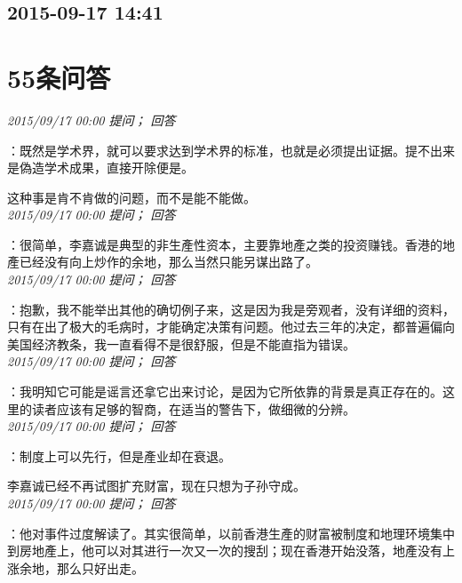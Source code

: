 \documentclass[twocolumn]{ctexart}
\begin{document}
\subsection{2015-09-17 14:41}


\section{55条问答}

\textit{\hfill\noindent\small 2015/09/17 00:00 提问； 回答}

：既然是学术界，就可以要求达到学术界的标准，也就是必须提出证据。提不出来是偽造学术成果，直接开除便是。

这种事是肯不肯做的问题，而不是能不能做。\\

\textit{\hfill\noindent\small 2015/09/17 00:00 提问； 回答}

：很简单，李嘉诚是典型的非生產性资本，主要靠地產之类的投资赚钱。香港的地產已经没有向上炒作的余地，那么当然只能另谋出路了。\\

\textit{\hfill\noindent\small 2015/09/17 00:00 提问； 回答}

：抱歉，我不能举出其他的确切例子来，这是因为我是旁观者，没有详细的资料，只有在出了极大的毛病时，才能确定决策有问题。他过去三年的决定，都普遍偏向美国经济教条，我一直看得不是很舒服，但是不能直指为错误。\\

\textit{\hfill\noindent\small 2015/09/17 00:00 提问； 回答}

：我明知它可能是谣言还拿它出来讨论，是因为它所依靠的背景是真正存在的。这里的读者应该有足够的智商，在适当的警告下，做细微的分辨。\\

\textit{\hfill\noindent\small 2015/09/17 00:00 提问； 回答}

：制度上可以先行，但是產业却在衰退。

李嘉诚已经不再试图扩充财富，现在只想为子孙守成。\\

\textit{\hfill\noindent\small 2015/09/17 00:00 提问； 回答}

：他对事件过度解读了。其实很简单，以前香港生產的财富被制度和地理环境集中到房地產上，他可以对其进行一次又一次的搜刮；现在香港开始没落，地產没有上涨余地，那么只好出走。\\
\end{document}
